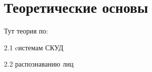\section{Теоретические основы}

Тут теория по:

\begin{itemize*}
\item 2.1 cистемам СКУД
\item 2.2 распознаванию лиц
\end{itemize*}
